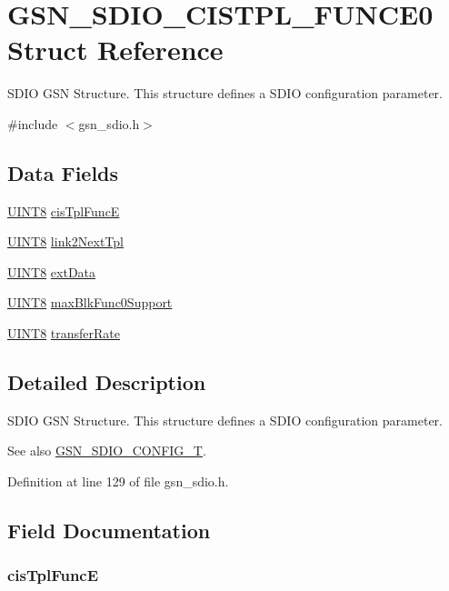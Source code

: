 \hypertarget{a00219}{
\section{GSN\_\-SDIO\_\-CISTPL\_\-FUNCE0 Struct Reference}
\label{a00219}
}


SDIO GSN Structure. This structure defines a SDIO configuration parameter.  




{\ttfamily \#include $<$gsn\_\-sdio.h$>$}

\subsection*{Data Fields}
\begin{DoxyCompactItemize}
\item 
\hyperlink{a00660_gab27e9918b538ce9d8ca692479b375b6a}{UINT8} \hyperlink{a00219_aa50b3b68afb8f4b33949227fd5c247b0}{cisTplFuncE}
\item 
\hyperlink{a00660_gab27e9918b538ce9d8ca692479b375b6a}{UINT8} \hyperlink{a00219_adb5f177f5de86565991790a9c2c079b5}{link2NextTpl}
\item 
\hyperlink{a00660_gab27e9918b538ce9d8ca692479b375b6a}{UINT8} \hyperlink{a00219_ade674e1ace532b93e6d9907c14f02728}{extData}
\item 
\hyperlink{a00660_gab27e9918b538ce9d8ca692479b375b6a}{UINT8} \hyperlink{a00219_af215d56dbf44b25531029ab41ee5961c}{maxBlkFunc0Support}
\item 
\hyperlink{a00660_gab27e9918b538ce9d8ca692479b375b6a}{UINT8} \hyperlink{a00219_a2314dc87991ad0a1f1b6f8adfc52c476}{transferRate}
\end{DoxyCompactItemize}


\subsection{Detailed Description}
SDIO GSN Structure. This structure defines a SDIO configuration parameter. 

\begin{DoxySeeAlso}{See also}
\hyperlink{a00653_ga741fda4dc2cd93143a8a73ddaace7de8}{GSN\_\-SDIO\_\-CONFIG\_\-T}. 
\end{DoxySeeAlso}


Definition at line 129 of file gsn\_\-sdio.h.



\subsection{Field Documentation}
\hypertarget{a00219_aa50b3b68afb8f4b33949227fd5c247b0}{
\subsubsection[{cisTplFuncE}]{ {\bf cisTplFuncE}}}
\label{a00219_aa50b3b68afb8f4b33949227fd5c247b0}


